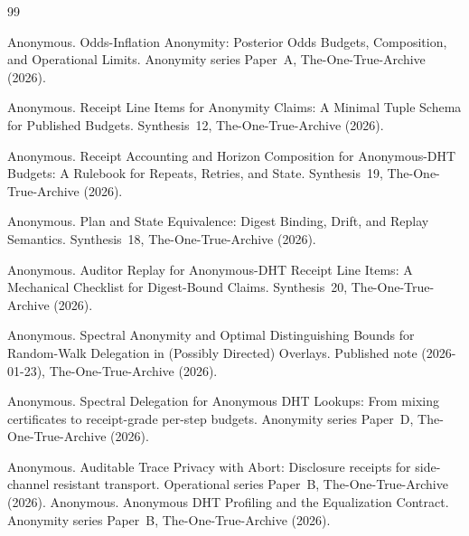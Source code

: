 \documentclass[11pt]{article}
\begin{document}
\begin{thebibliography}{99}\small

Anonymous.
\newblock Odds-Inflation Anonymity: Posterior Odds Budgets, Composition, and Operational Limits.
\newblock Anonymity series Paper~A, The-One-True-Archive (2026).

Anonymous.
\newblock Receipt Line Items for Anonymity Claims: A Minimal Tuple Schema for Published Budgets.
\newblock Synthesis~12, The-One-True-Archive (2026).

Anonymous.
\newblock Receipt Accounting and Horizon Composition for Anonymous-DHT Budgets: A Rulebook for Repeats, Retries, and State.
\newblock Synthesis~19, The-One-True-Archive (2026).

Anonymous.
\newblock Plan and State Equivalence: Digest Binding, Drift, and Replay Semantics.
\newblock Synthesis~18, The-One-True-Archive (2026).

Anonymous.
\newblock Auditor Replay for Anonymous-DHT Receipt Line Items: A Mechanical Checklist for Digest-Bound Claims.
\newblock Synthesis~20, The-One-True-Archive (2026).

Anonymous.
\newblock Spectral Anonymity and Optimal Distinguishing Bounds for Random-Walk Delegation in (Possibly Directed) Overlays.
\newblock Published note (2026-01-23), The-One-True-Archive (2026).

Anonymous.
\newblock Spectral Delegation for Anonymous DHT Lookups: From mixing certificates to receipt-grade per-step budgets.
\newblock Anonymity series Paper~D, The-One-True-Archive (2026).

Anonymous.
\newblock Auditable Trace Privacy with Abort: Disclosure receipts for side-channel resistant transport.
\newblock Operational series Paper~B, The-One-True-Archive (2026).
Anonymous.
\newblock Anonymous DHT Profiling and the Equalization Contract.
\newblock Anonymity series Paper~B, The-One-True-Archive (2026).
\end{thebibliography}
\end{document}
